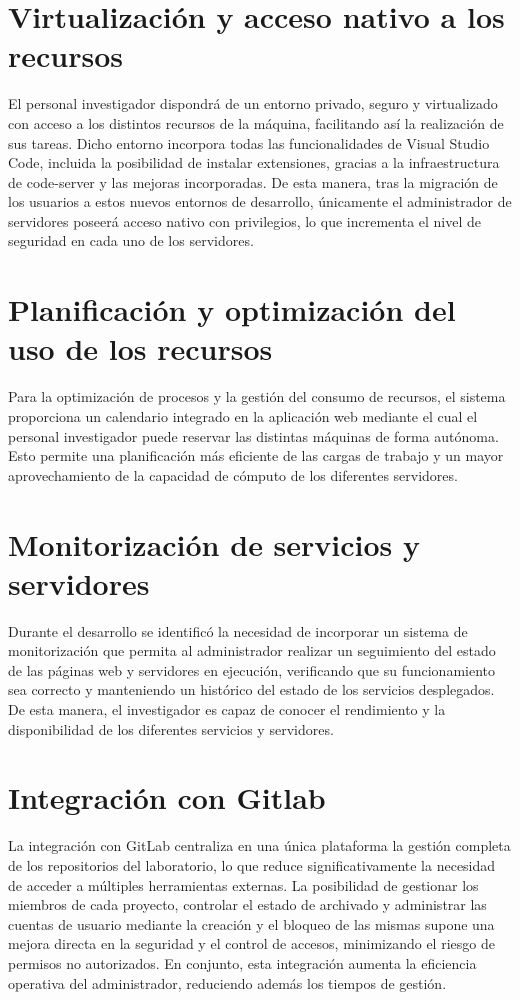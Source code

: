 \section{Virtualización y acceso nativo a los recursos}

El personal investigador dispondrá de un entorno privado, seguro y virtualizado con acceso a los distintos recursos de la máquina, facilitando así la realización de sus tareas. Dicho entorno incorpora todas las funcionalidades de Visual Studio Code, incluida la posibilidad de instalar extensiones, gracias a la infraestructura de code-server y las mejoras incorporadas. De esta manera, tras la migración de los usuarios a estos nuevos entornos de desarrollo, únicamente el administrador de servidores poseerá acceso nativo con privilegios, lo que incrementa el nivel de seguridad en cada uno de los servidores.


\section{Planificación y optimización del uso de los recursos}
Para la optimización de procesos y la gestión del consumo de recursos, el sistema proporciona un calendario integrado en la aplicación web mediante el cual el personal investigador puede reservar las distintas máquinas de forma autónoma. Esto permite una planificación más eficiente de las cargas de trabajo y un mayor aprovechamiento de la capacidad de cómputo de los diferentes servidores.

\section{Monitorización de servicios y servidores}
Durante el desarrollo se identificó la necesidad de incorporar un sistema de monitorización que permita al administrador realizar un seguimiento del estado de las páginas web y servidores en ejecución, verificando que su funcionamiento sea correcto y manteniendo un histórico del estado de los servicios desplegados. De esta manera, el investigador es capaz de conocer el rendimiento y la disponibilidad de los diferentes servicios y servidores.

\section{Integración con Gitlab}
La integración con GitLab centraliza en una única plataforma la gestión completa de los repositorios del laboratorio, lo que reduce significativamente la necesidad de acceder a múltiples herramientas externas. La posibilidad de gestionar los miembros de cada proyecto, controlar el estado de archivado y administrar las cuentas de usuario mediante la creación y el bloqueo de las mismas supone una mejora directa en la seguridad y el control de accesos, minimizando el riesgo de permisos no autorizados. En conjunto, esta integración aumenta la eficiencia operativa del administrador, reduciendo además los tiempos de gestión.

